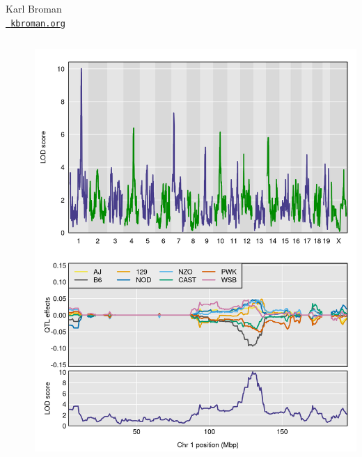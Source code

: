 \documentclass[aspectratio=169,12pt,t]{beamer}
\begin{document}
{\begin{frame}{Karl Broman \\[-6pt]
    \href{https://kbroman.org}{\tt \small \color{foreground} kbroman.org}}
\begin{columns}
\begin{column}{0.40\textwidth}
  \end{column}

    \begin{column}{0.05\textwidth}
    \end{column}

    \begin{column}{0.55\textwidth}

      \vspace*{-0.3\textheight}
      \hspace*{0.05\textwidth}
      \includegraphics[height=1.04\textheight]{Figs/lod_curves.png}

    \end{column}

  \end{columns}


\end{frame}


}
\end{document}
